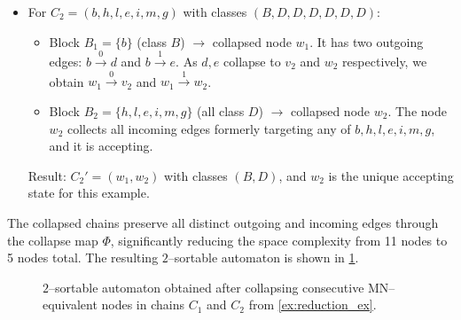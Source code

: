 \begin{example}
\begin{itemize}
        \item For $C_2 = (b,h,l,e,i,m,g)$ with classes $(B,D,D,D,D,D,D)$:
        \begin{itemize}
            \item Block $B_1 = \{b\}$ (class $B$) $\rightarrow$ collapsed node $w_1$. It has two outgoing edges: $b \xrightarrow{0} d$ and $b \xrightarrow{1} e$. As $d,e$ collapse to $v_2$ and $w_2$ respectively, we obtain $w_1 \xrightarrow{0} v_2$ and $w_1 \xrightarrow{1} w_2$.
            \item Block $B_2 = \{h,l,e,i,m,g\}$ (all class $D$) $\rightarrow$ collapsed node $w_2$. The node $w_2$ collects all incoming edges formerly targeting any of $b,h,l,e,i,m,g$, and it is accepting.
        \end{itemize}
        Result: $C_2' = (w_1, w_2)$ with classes $(B,D)$, and $w_2$ is the unique accepting state for this example.
    \end{itemize}
    
    The collapsed chains preserve all distinct outgoing and incoming edges through the collapse map $\Phi$, significantly reducing the space complexity from 11 nodes to 5 nodes total. The resulting $2$--sortable automaton is shown in \cref{fig:minimized_chains}.

    \begin{figure}[H]
        \centering
        \caption{$2$--sortable automaton obtained after collapsing consecutive MN--equivalent nodes in chains $C_1$ and $C_2$ from \cref{ex:reduction_ex}.}
        \label{fig:minimized_chains}
    \end{figure} 
\end{example}


